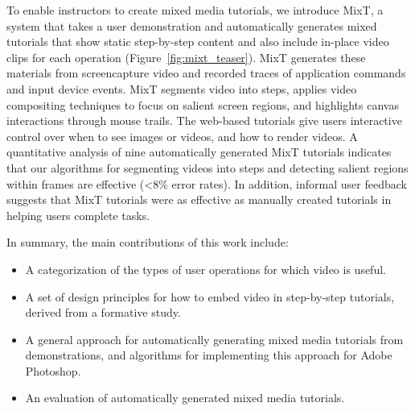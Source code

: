 To enable instructors to create mixed media tutorials, we introduce MixT, a system that takes a user demonstration and automatically generates mixed tutorials that show static step-by-step content and also include in-place video clips for each operation (Figure~\ref{fig:mixt_teaser}). MixT generates these materials from screencapture video and recorded traces of application commands and input device events. MixT segments video into steps, applies video compositing techniques to focus on salient screen regions, and highlights canvas interactions through mouse trails. The web-based tutorials give users interactive control over when to see images or videos, and how to render videos. A quantitative analysis of nine automatically generated MixT tutorials indicates that our algorithms for segmenting videos into steps and detecting salient regions within frames are effective ({\textless}8\% error rates). In addition, informal user feedback suggests that MixT tutorials were as effective as manually created tutorials in helping users complete tasks.

In summary, the main contributions of this work include:

\begin{itemize}
  \item A categorization of the types of user operations for which video is useful.
  \item A set of design principles for how to embed video in step-by-step tutorials, derived from a formative study.
  \item A general approach for automatically generating mixed media tutorials from demonstrations, and algorithms for implementing this approach for Adobe Photoshop.
  \item An evaluation of automatically generated mixed media tutorials.
\end{itemize}
